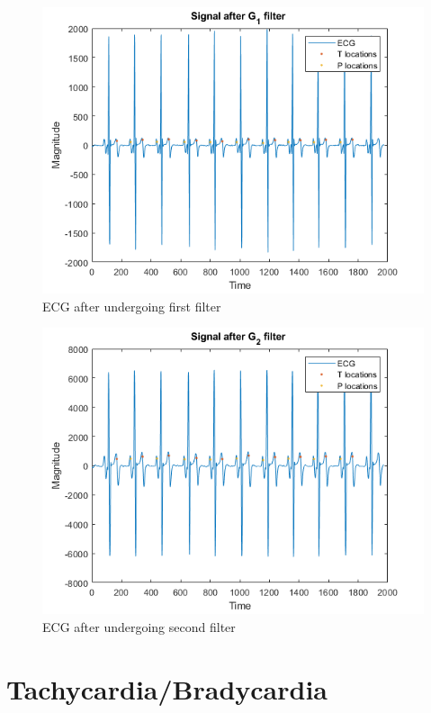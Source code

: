 \documentclass{article}
\begin{document}
\begin{figure}[H]
\centerline{\includegraphics[scale=0.5]{sig_G1.png}}
\caption{ECG after undergoing first filter}
\end{figure}

\begin{figure}[H]
\centerline{\includegraphics[scale=0.5]{sig_G2.png}}
\caption{ECG after undergoing second filter}
\end{figure}
 

\section{Tachycardia/Bradycardia}
\end{document}
